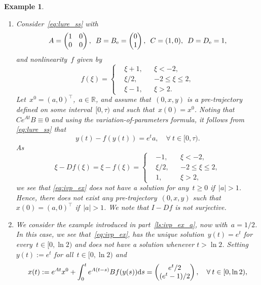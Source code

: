 \documentclass[a4paper,11pt]{article}
\newcommand{\R}{\mathbb R}
\numberwithin{equation}{section}
\numberwithin{figure}{section}
\numberwithin{table}{section}
\newtheorem{example}[theorem]{Example}
\begin{document}
\begin{example}\label{exa:ivp}
\begin{rm}
\begin{enumerate}[label = {\bf (\alph*)}, ref={\rm (\alph*)}, leftmargin = 0ex, itemindent = 4.6ex]
\item\label{ls:ivp_ex_a}
Consider~\eqref{eq:lure_ss} with
\[
A=\begin{pmatrix} 1 & 0\\ 0 & 0\end{pmatrix},\,\,\,
B=B_{\rm e}=\begin{pmatrix} 0 \\ 1 \end{pmatrix},\,\,\, C=(1,0),\,\,\,D=D_{\rm e}=1,
\]
and nonlinearity~$f$ given by
\[
f(\xi)=\left\{ \begin{aligned} & \xi+1, & & \xi<-2, \\
& \xi/2, & &-2\leq\xi\leq 2, \\
& \xi-1, & & \xi>2.
\end{aligned}\right.
\]
Let~$x^0=(a,0)^\top$,~$a\in\R$, and assume that~$(0,x,y)$ is a  pre-trajectory defined on some interval~$[0,\tau)$ and such that~$x(0)=x^0$. Noting that $Ce^{At}B\equiv 0$ and using the variation-of-parameters formula, it follows from \eqref{eq:lure_ss} that
\begin{equation}\label{eq:ivp_ex}
y(t)-f(y(t))=e^{t}a,\quad\forall\:t\in[0,\tau).
\end{equation}
As
\[
\xi-Df(\xi)=\xi-f(\xi)=\left\{ \begin{aligned} & -1, & & \xi<-2, \\
& \xi/2, & &-2\leq\xi\leq 2, \\
& 1, & & \xi>2,
\end{aligned}\right.
\]
we see that \eqref{eq:ivp_ex} does not have a solution
for any~$t\geq 0$ if~$|a|>1$. Hence, there does not exist any pre-trajectory~$(0,x,y)$
such that~$x(0)=(a,0)^\top$ if~$|a|>1$. We note that $I-Df$ is not surjective.
%
\item\label{ls:ivp_ex_b} We consider the example introduced in part~\ref{ls:ivp_ex_a}, now with~$a=1/2$. In this case, we see that~\eqref{eq:ivp_ex}, has the unique solution~$y(t)=e^t$ for every~$t\in[0,\ln 2)$ and does not have a solution whenever $t>\ln 2$.
Setting~$y(t):=e^t$ for all~$t\in[0,\ln 2)$ and
\[
x(t):=e^{At}x^0+\int_0^te^{A(t-s)}Bf(y(s)){\rm d}s=\begin{pmatrix} e^t/2\\ (e^t-1)/2\end{pmatrix},\quad\forall\:t\in[0,\ln 2),
\]
\end{enumerate}
\end{rm}
\end{example}
\end{document}
